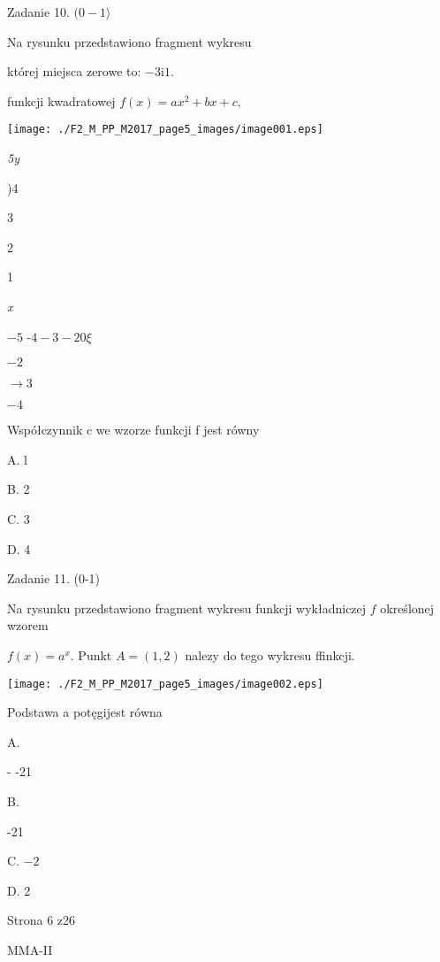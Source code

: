 \documentclass[a4paper,12pt]{article}
\begin{document}
Zadanie 10. $(0-1\rangle$

Na rysunku przedstawiono fragment wykresu

której miejsca zerowe to: $-3 \mathrm{i}1.$

funkcji kwadratowej $f(x)=ax^{2}+bx+c,$
\begin{center}
\texttt{[image: ./F2\_M\_PP\_M2017\_page5\_images/image001.eps]}
\end{center}
{\it 5y}

)4

3

2

1

{\it x}

$-5$ -$4  -3 -2  0 \xi$

$-2$

$\rightarrow 3$

$-4$

Współczynnik c we wzorze funkcji f jest równy

A. l

B. 2

C. 3

D. 4

Zadanie 11. (0-1)

Na rysunku przedstawiono fragment wykresu funkcji wykładniczej $f$ określonej wzorem

$f(x)=a^{x}$. Punkt $A=(1,2)$ nalezy do tego wykresu ffinkcji.
\begin{center}
\texttt{[image: ./F2\_M\_PP\_M2017\_page5\_images/image002.eps]}
\end{center}
Podstawa a potęgijest równa

A.

- -21

B.

-21

C. $-2$

D. 2

Strona 6 z26

MMA-II
\end{document}
